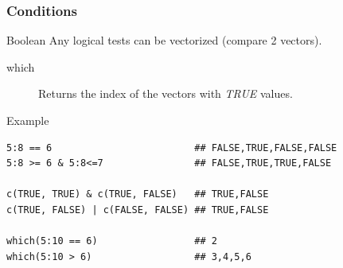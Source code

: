 \documentclass[10pt]{beamer}
\newenvironment{xframe}[2][]
  {\begin{frame}[fragile,environment=xframe,#1]
  \frametitle{#2}}
  {\end{frame}}
\begin{document}
\begin{xframe}{Conditions}
  \begin{block}{Boolean}
  Any logical tests can be vectorized (compare 2 {\sf vector}s).
    \begin{description}
    \item[which] Returns the index of the {\sf vector}s with {\it TRUE} values.
    \end{description}
  \end{block}
  \begin{exampleblock}{Example}
\begin{verbatim}
5:8 == 6                         ## FALSE,TRUE,FALSE,FALSE
5:8 >= 6 & 5:8<=7                ## FALSE,TRUE,TRUE,FALSE

c(TRUE, TRUE) & c(TRUE, FALSE)   ## TRUE,FALSE
c(TRUE, FALSE) | c(FALSE, FALSE) ## TRUE,FALSE

which(5:10 == 6)                 ## 2
which(5:10 > 6)                  ## 3,4,5,6
\end{verbatim}  
  \end{exampleblock}
\end{xframe}
\end{document}
